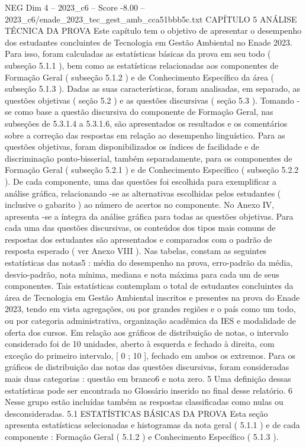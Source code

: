 \begin{textsample}{NEG Dim 4 – 2023\_c6 – Score -8.00 – 2023\_c6/enade\_2023\_tec\_gest\_amb\_cca51bbb5c.txt}  \label{ex:f4_neg_019}
CAPÍTULO 5 ANÁLISE TÉCNICA DA PROVA Este capítulo tem o objetivo de apresentar o desempenho dos estudantes concluintes de Tecnologia em Gestão Ambiental no Enade 2023.
Para isso, foram calculadas as estatísticas básicas da prova em seu todo ( subseção 5.1.1 ), bem como as estatísticas relacionadas aos componentes de Formação Geral ( subseção 5.1.2 ) e de Conhecimento Específico da área ( subseção 5.1.3 ).
Dadas as suas características, foram analisadas, em separado, as questões objetivas ( seção 5.2 ) e as questões discursivas ( seção 5.3 ).
Tomando -se como base a questão discursiva do componente de Formação Geral, nas subseções de 5.3.1.4 a 5.3.1.6, são apresentados os resultados e os comentários sobre a correção das respostas em relação ao desempenho linguístico.
Para as questões objetivas, foram disponibilizados os índices de facilidade e de discriminação ponto-bisserial, também separadamente, para os componentes de Formação Geral ( subseção 5.2.1 ) e de Conhecimento Específico ( subseção 5.2.2 ).
De cada componente, uma das questões foi escolhida para exemplificar a análise gráfica, relacionando -se as alternativas escolhidas pelos estudantes ( inclusive o gabarito ) ao número de acertos no componente.
No Anexo IV, apresenta -se a íntegra da análise gráfica para todas as questões objetivas.
Para cada uma das questões discursivas, os conteúdos dos tipos mais comuns de respostas dos estudantes são apresentados e comparados com o padrão de resposta esperado ( ver Anexo VIII ).
Nas tabelas, constam as seguintes estatísticas das notas5 : média do desempenho na prova, erro-padrão da média, desvio-padrão, nota mínima, mediana e nota máxima para cada um de seus componentes.
Tais estatísticas contemplam o total de estudantes concluintes da área de Tecnologia em Gestão Ambiental inscritos e presentes na prova do Enade 2023, tendo em vista agregações, ou por grandes regiões e o país como um todo, ou por categoria administrativa, organização acadêmica da IES e modalidade de oferta dos cursos.
Em relação aos gráficos de distribuição de notas, o intervalo considerado foi de 10 unidades, aberto à esquerda e fechado à direita, com exceção do primeiro intervalo, [ 0 ; 10 ], fechado em ambos os extremos.
Para os gráficos de distribuição das notas das questões discursivas, foram consideradas mais duas categorias : questão em branco6 e nota zero. 5 Uma definição dessas estatísticas pode ser encontrada no Glossário inserido no final desse relatório. 6 Nesse grupo estão incluídas também as respostas classificadas como nulas ou desconsideradas. 5.1 ESTATÍSTICAS BÁSICAS DA PROVA Esta seção apresenta estatísticas selecionadas e histogramas da nota geral ( 5.1.1 ) e de cada componente : Formação Geral ( 5.1.2 ) e Conhecimento Específico ( 5.1.3 ).

\end{textsample}
